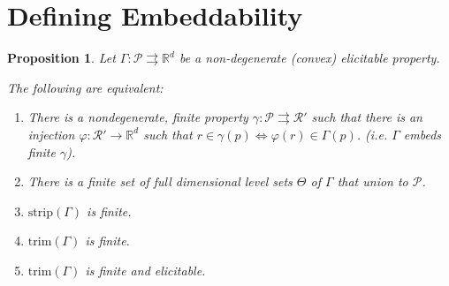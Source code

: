 \documentclass[12pt]{article}
\newcommand{\reals}{\mathbb{R}}
\renewcommand{\P}{\mathcal{P}}
\newcommand{\R}{\mathcal{R}}
\newcommand{\toto}{\rightrightarrows}
\newcommand{\trim}{\mathrm{trim}}
\newcommand{\strip}{\mathrm{strip}}
\newtheorem{proposition}{Proposition}
\begin{document}
\section{Defining Embeddability}


\begin{proposition}\label{prop:optimal-reports-per-level-set}
  Let $\Gamma:\P\toto\reals^d$ be a non-degenerate (convex) elicitable property.

  The following are equivalent:
  \begin{enumerate}
  \item There is a nondegenerate, finite property $\gamma:\P\toto\R'$ such that there is an injection $\varphi:\R'\to\reals^d$ such that $r\in\gamma(p) \iff \varphi(r) \in \Gamma(p)$. (i.e. $\Gamma$ embeds finite $\gamma$).  
  \item There is a finite set of full dimensional level sets $\Theta$ of $\Gamma$ that union to $\P$.
  \item $\strip(\Gamma)$ is finite.
  \item $\trim(\Gamma)$ is finite.
  \item $\trim(\Gamma)$ is finite and elicitable.
  \end{enumerate}
\end{proposition}
\end{document}
